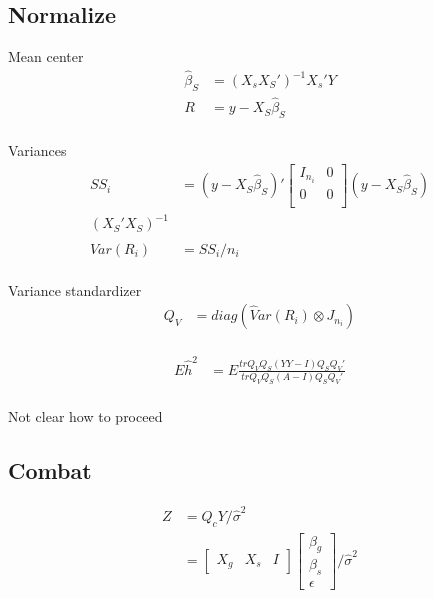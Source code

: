 \documentclass{article}
\begin{document}
\subsection{Normalize}
Mean center
\begin{align*}
	\hat \beta_S & = (X_sX_S')^{-1}X_s'Y \\
	R & = y - X_S\hat \beta_S \\
\end{align*}

Variances
\begin{align*}
	SS_{i} & = (y - X_S\hat \beta_S)'\begin{bmatrix}
	I_{n_i} & 0 \\
	0 & 0 \\
	\end{bmatrix}(y - X_S\hat \beta_S) \\ 
	(X_S'X_S)^{-1} \tag{Site counts} \\
	\hat Var(R_i) & = SS_i/ n_i  \\
\end{align*}

Variance standardizer
\begin{align*}
	Q_V & = diag(\hat Var(R_i) \otimes J_{n_i})  \\
\end{align*}

\begin{align*}
	E\hat h^2 & =  E\frac{tr Q_VQ_S(YY - I)Q_SQ_V'}{trQ_VQ_S(A - I)Q_SQ_V'} \\
\end{align*}

Not clear how to proceed

\subsection{Combat}

\begin{align*}
	Z & = Q_cY / \hat \sigma^2 \tag{ Standardize} \\
	& = \begin{bmatrix}
	X_g & X_s & I
	\end{bmatrix} \begin{bmatrix}
	\beta_g  \\ \beta_s \\ \epsilon
	\end{bmatrix} / \hat \sigma^2
\end{align*}
\end{document}
